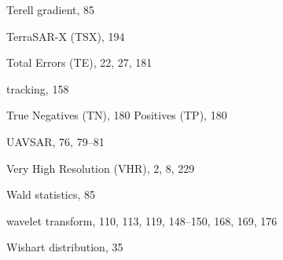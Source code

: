\documentclass[fleqn,treatise,allpages]{ISTE_Science}
\begin{document}
\begin{theindex}
  \item Terell gradient, 85
  \item TerraSAR-X (TSX), 194
  \item Total Errors (TE), 22, 27, 181
  \item tracking, 158
  \item True
  \subitem Negatives (TN), 180
  \subitem Positives (TP), 180
  \item UAVSAR, 76, 79--81
  \item Very High Resolution (VHR), 2, 8, 229
  \item Wald statistics, 85
  \item wavelet transform, 110, 113, 119, 148--150, 168, 169, 176
  \item Wishart distribution, 35

\end{theindex}

\pagebreak
\
\thispagestyle{empty}
\end{document}
